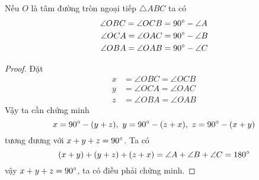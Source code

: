 \begin{lemma}
	Nếu $O$ là tâm đường tròn ngoại tiếp $\triangle ABC$ ta có
	\begin{align*}
		\angle OBC = \angle OCB &= 90 \degree - \angle A \\ 
		\angle OCA = \angle OAC &= 90 \degree - \angle B \\ 
		\angle OBA = \angle OAB &= 90 \degree - \angle C
	\end{align*}
\end{lemma}

\begin{center}

\end{center}

\begin{proof}
	Đặt
	\begin{align*}
		x &= \angle OBC = \angle OCB \\ 
		y &= \angle OCA = \angle OAC \\ 
		z &= \angle OBA = \angle OAB 
	\end{align*}
	Vậy ta cần chứng minh
	\[
		x = 90 \degree - (y + z),\ y = 90 \degree - (z + x),\ z = 90 \degree - (x + y)
	\]
	tương đương với $x + y + z = 90 \degree$.
	Ta có 
	\[
		(x + y) + (y + z) + (z + x) = \angle A + \angle B + \angle C = 180 \degree
	\]
	vậy $x + y + z = 90 \degree$, ta có điều phải chứng minh.
\end{proof}